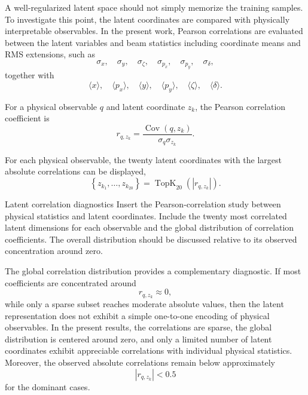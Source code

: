 A well-regularized latent space should not simply memorize the training samples. To investigate this point, the latent coordinates are compared with physically interpretable observables. In the present work, Pearson correlations are evaluated between the latent variables and beam statistics including coordinate means and RMS extensions, such as
\begin{equation}
\sigma_x,
\quad
\sigma_y,
\quad
\sigma_{\zeta},
\quad
\sigma_{p_x},
\quad
\sigma_{p_y},
\quad
\sigma_{\delta},
\end{equation}
together with
\begin{equation}
\langle x\rangle,
\quad
\langle p_x\rangle,
\quad
\langle y\rangle,
\quad
\langle p_y\rangle,
\quad
\langle\zeta\rangle,
\quad
\langle\delta\rangle.
\end{equation}

For a physical observable \(q\) and latent coordinate \(z_k\), the Pearson correlation coefficient is
\begin{equation}
r_{q,z_k}
=
\frac{
\operatorname{Cov}(q,z_k)
}{
\sigma_q \sigma_{z_k}
}.
\label{eq:pearson_latent_physics}
\end{equation}

For each physical observable, the twenty latent coordinates with the largest absolute correlations can be displayed,
\begin{equation}
\left\{
z_{k_1},
\ldots,
z_{k_{20}}
\right\}
=
\operatorname{TopK}_{20}
\left(
|r_{q,z_k}|
\right).
\label{eq:top20_latent_correlations}
\end{equation}

\placeholderfigure
{Latent correlation diagnostics}
{Insert the Pearson-correlation study between physical statistics and latent coordinates. Include the twenty most correlated latent dimensions for each observable and the global distribution of correlation coefficients. The overall distribution should be discussed relative to its observed concentration around zero.}

The global correlation distribution provides a complementary diagnostic. If most coefficients are concentrated around
\begin{equation}
r_{q,z_k}\approx 0,
\end{equation}
while only a sparse subset reaches moderate absolute values, then the latent representation does not exhibit a simple one-to-one encoding of physical observables. In the present results, the correlations are sparse, the global distribution is centered around zero, and only a limited number of latent coordinates exhibit appreciable correlations with individual physical statistics. Moreover, the observed absolute correlations remain below approximately
\begin{equation}
|r_{q,z_k}|<0.5
\end{equation}
for the dominant cases.

